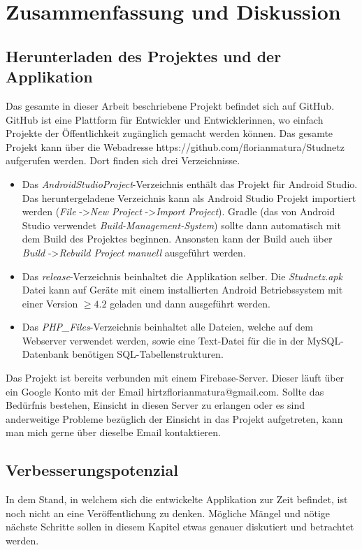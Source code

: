 \documentclass[../main.tex]{subfiles}
\begin{document}
	\chapter{Zusammenfassung und Diskussion}
	
		\section{Herunterladen des Projektes und der Applikation} \label{github}
	Das gesamte in dieser Arbeit beschriebene Projekt befindet sich auf GitHub. GitHub ist eine Plattform für Entwickler und Entwicklerinnen, wo einfach Projekte der Öffentlichkeit zugänglich gemacht werden können. Das gesamte Projekt kann über die Webadresse https://github.com/florianmatura/Studnetz aufgerufen werden. Dort finden sich drei Verzeichnisse.
	
	\begin{itemize}
		\item Das \emph{AndroidStudioProject}-Verzeichnis enthält das Projekt für Android Studio. Das heruntergeladene Verzeichnis kann als Android Studio Projekt importiert werden (\emph{File} -\textgreater \emph{New Project} -\textgreater \emph{Import Project}). Gradle (das von Android Studio verwendet \emph{Build-Management-System}) sollte dann automatisch mit dem Build des Projektes beginnen. Ansonsten kann der Build auch über \emph{Build} -\textgreater \emph{Rebuild Project manuell} ausgeführt werden.
		\item Das \emph{release}-Verzeichnis beinhaltet die Applikation selber. Die \emph{Studnetz.apk} Datei kann auf Geräte mit einem installierten Android Betriebssystem mit einer Version $\ge4.2$ geladen und dann ausgeführt werden.
		\item Das \emph{PHP\_Files}-Verzeichnis beinhaltet alle Dateien, welche auf dem Webserver verwendet werden, sowie eine Text-Datei für die in der MySQL-Datenbank benötigen SQL-Tabellenstrukturen.
	\end{itemize}
	
	Das Projekt ist bereits verbunden mit einem Firebase-Server. Dieser läuft über ein Google Konto mit der Email hirtzflorianmatura@gmail.com. Sollte das Bedürfnis bestehen, Einsicht in diesen Server zu erlangen oder es sind anderweitige Probleme bezüglich der Einsicht in das Projekt aufgetreten, kann man mich gerne über dieselbe Email kontaktieren.
	
	\section{Verbesserungspotenzial}
	In dem Stand, in welchem sich die entwickelte Applikation zur Zeit befindet, ist noch nicht an eine Veröffentlichung zu denken. Mögliche Mängel und nötige nächste Schritte sollen in diesem Kapitel etwas genauer diskutiert und betrachtet werden.
	
\end{document}
